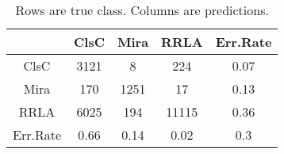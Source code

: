\begin{table}[htb]
\begin{center}
\begin{tabular}{cccc|c}
  & ClsC & Mira & RRLA & Err.Rate \\ 
  \hline
ClsC & 3121 & 8 & 224 & 0.07 \\ 
  Mira & 170 & 1251 & 17 & 0.13 \\ 
  RRLA & 6025 & 194 & 11115 & 0.36 \\ 
   \hline
Err.Rate & 0.66 & 0.14 & 0.02 & 0.3 \\ 
  \end{tabular}
\caption{Rows are true class. Columns are predictions.}
\end{center}
\end{table}

